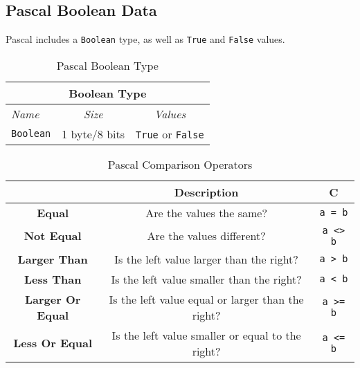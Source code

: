 \clearpage
\subsection{Pascal Boolean Data} %
\label{sub:pas_boolean_data}

Pascal includes a \texttt{Boolean} type, as well as \texttt{True} and \texttt{False} values.

\begin{table}[h] 
\begin{minipage}{\textwidth}
\centering
\begin{tabular}{|l|c|c|}
\hline
\multicolumn{3}{|c|}{\textbf{Boolean Type}} \\
\hline
\emph{Name} & \emph{Size} & \emph{Values} \\
\hline
\texttt{Boolean} & 1 byte/8 bits & \texttt{True} or \texttt{False} \\
\hline
\end{tabular}
\caption{Pascal Boolean Type}\label{tbl:pas-boolean}
\end{minipage}
\end{table}

\begin{table}[h]
  \centering
  \begin{tabular}{|c|c|c|}
    \hline
     & \textbf{Description} & \textbf{C} \\
    \hline
    \textbf{Equal} & Are the values the same? & \texttt{a = b} \\
    \hline
    \textbf{Not Equal} & Are the values different? & \texttt{a <> b} \\
    \hline
    \textbf{Larger Than} & Is the left value larger than the right? & \texttt{a > b}  \\
    \hline
    \textbf{Less Than} & Is the left value smaller than the right? & \texttt{a < b}  \\
    \hline
    \textbf{Larger Or Equal} & Is the left value equal or larger than the right? & \texttt{a >= b}  \\
    \hline
    \textbf{Less Or Equal} & Is the left value smaller or equal to the right? & \texttt{a <= b}  \\
    \hline
  \end{tabular}
  \caption{Pascal Comparison Operators}
  \label{tbl:pas_comparison_op}
\end{table}

